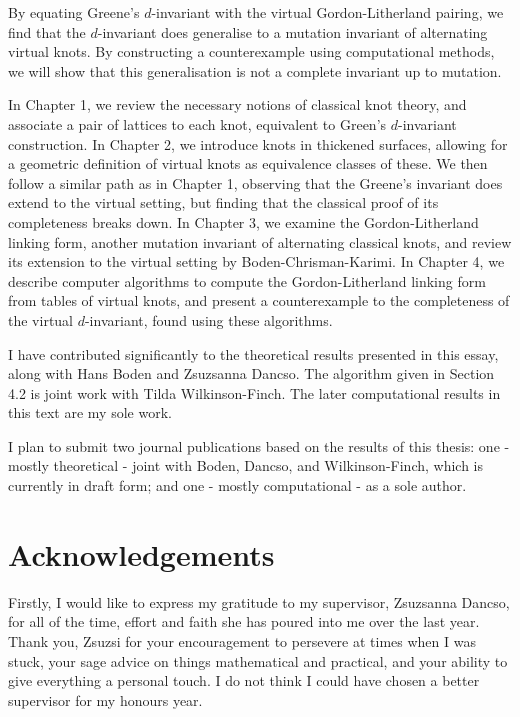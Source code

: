\documentclass[12pt]{report}
\theoremstyle{upright}
\begin{document}
By equating Greene's $d$-invariant with the virtual Gordon-Litherland pairing, we find that the $d$-invariant does generalise to a mutation invariant of alternating virtual knots. By constructing a counterexample using computational methods, we will show that this generalisation is not a complete invariant up to mutation.

In Chapter 1, we review the necessary notions of classical knot theory, and associate a pair of lattices to each knot, equivalent to Green's $d$-invariant construction. In Chapter 2, we introduce knots in thickened surfaces, allowing for a geometric definition of virtual knots as equivalence classes of these. We then follow a similar path as in Chapter 1, observing that the Greene's invariant does extend to the virtual setting, but finding that the classical proof of its completeness breaks down. In Chapter 3, we examine the Gordon-Litherland linking form, another mutation invariant of alternating classical knots, and review its extension to the virtual setting by Boden-Chrisman-Karimi. In Chapter 4, we describe computer algorithms to compute the Gordon-Litherland linking form from tables of virtual knots, and present a counterexample to the completeness of the virtual $d$-invariant, found using these algorithms.

I have contributed significantly to the theoretical results presented in this essay, along with Hans Boden and Zsuzsanna Dancso. The algorithm given in Section 4.2 is joint work with Tilda Wilkinson-Finch. The later computational results in this text are my sole work.

I plan to submit two journal publications based on the results of this thesis: one - mostly theoretical - joint with Boden, Dancso, and Wilkinson-Finch, which is currently in draft form; and one - mostly computational - as a sole author.

\chapter*{Acknowledgements}

Firstly, I would like to express my gratitude to my supervisor, Zsuzsanna Dancso, for all of the time, effort and faith she has poured into me over the last year. Thank you, Zsuzsi for your encouragement to persevere at times when I was stuck, your sage advice on things mathematical and practical, and your ability to give everything a personal touch. I do not think I could have chosen a better supervisor for my honours year.
\end{document}
